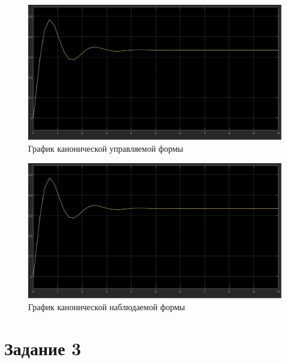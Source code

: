 \documentclass[a4paper, 12pt]{article}
\begin{document}
    \begin{figure}[H]
        \centering
        \includegraphics[scale=0.3]{canonical_controlled_form_2.jpg}
        \captionsetup{skip=0pt}
        \caption{График канонической управляемой формы}
        \label{fig:ccf2}
    \end{figure}
    \begin{figure}[H]
        \centering
        \includegraphics[scale=0.3]{canonical_observable_form_2.jpg}
        \captionsetup{skip=0pt}
        \caption{График канонической наблюдаемой формы}
        \label{fig:cof2}
    \end{figure}


    \section{Задание 3}
\end{document}
